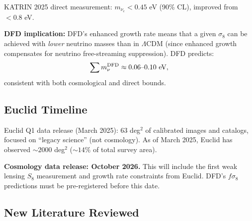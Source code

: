 \documentclass[11pt]{article}
\newcommand{\LCDM}{$\Lambda$CDM}
\begin{document}
KATRIN 2025 direct measurement: $m_{\nu_e} < 0.45$ eV (90\% CL),
improved from $< 0.8$ eV.

\textbf{DFD implication:} DFD's enhanced growth rate means that a
given $\sigma_8$ can be achieved with \emph{lower} neutrino masses
than in \LCDM{} (since enhanced growth compensates for neutrino
free-streaming suppression). DFD predicts:
\begin{equation}
  \sum m_\nu^{\rm DFD} \approx 0.06\text{--}0.10 \text{ eV},
\end{equation}
consistent with both cosmological and direct bounds.

\subsection{Euclid Timeline}

Euclid Q1 data release (March 2025): 63 deg$^2$ of calibrated images
and catalogs, focused on ``legacy science'' (not cosmology). As of
March 2025, Euclid has observed $\sim 2000$ deg$^2$ ($\sim 14\%$ of
total survey area).

\textbf{Cosmology data release: October 2026.} This will include
the first weak lensing $S_8$ measurement and growth rate constraints
from Euclid. DFD's $f\sigma_8$ predictions must be pre-registered
before this date.

\subsection{New Literature Reviewed}
\end{document}
